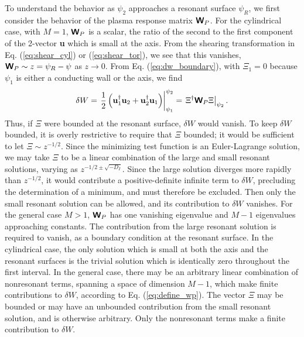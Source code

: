 \documentclass[prb,twocolumn,showpacs,preprintnumbers,amsmath,amssymb]{revtex4}
\renewcommand*{\v}[1]{\hbox{\bfseries #1}}
\renewcommand*{\t}[1]{\hbox{\sffamily\bfseries #1}}
\begin{document}
To understand the behavior as $\psi_2$ approaches a resonant surface
$\psi_R$, we first consider the behavior of the plasma response matrix
$\t{W}_P$.  For the cylindrical case, with $M=1$, $\t{W}_P$ is a scalar,
the ratio of the second to the first component of the 2-vector \v{u}
which is small at the axis.  From the shearing transformation in
Eq. (\ref{eq:shear_cyl}) or (\ref{eq:shear_tor}), we see that this
vanishes, $\t{W}_P \sim z=\psi_R-\psi$ as $z \to 0$.  From
Eq. (\ref{eq:dw_boundary}), with $\Xi_1=0$ because $\psi_1$ is either a
conducting wall or the axis, we find
\begin{equation}
\delta W 
= \left. \frac{1}{2} \left( 
	\v{u}_1^\dagger \v{u}_2 + \v{u}_2^\dagger \v{u}_1
	 \right) \right|_{\psi_1}^{\psi_2}
= \left. \Xi^\dagger \t{W}_P \Xi \right|_{\psi_2}.
\label{eq:define_wp}
\end{equation}
Thus, if $\Xi$ were bounded at the resonant surface, $\delta W$ would
vanish.  To keep $\delta W$ bounded, it is overly restrictive to require
that $\Xi$ bounded; it would be sufficient to let $\Xi \sim z^{-1/2}$.
Since the minimizing test function is an Euler-Lagrange solution, we may
take $\Xi$ to be a linear combination of the large and small resonant
solutions, varying as $z^{-1/2 \pm \sqrt{-D_I}}$.  Since the large
solution diverges more rapidly than $z^{-1/2}$, it would contribute a
positive-definite infinite term to $\delta W$, precluding the
determination of a minimum, and must therefore be excluded.  Then only
the small resonant solution can be allowed, and its contribution to
$\delta W$ vanishes.  For the general case $M > 1$, $\t{W}_P$ has one
vanishing eigenvalue and $M-1$ eigenvalues approaching constants.  The
contribution from the large resonant solution is required to vanish, as
a boundary condition at the resonant surface.  In the cylindrical case,
the only solution which is small at both the axis and the resonant
surfaces is the trivial solution which is identically zero throughout
the first interval.  In the general case, there may be an arbitrary
linear combination of nonresonant terms, spanning a space of dimension
$M-1$, which make finite contributions to $\delta W$, according to Eq.
(\ref{eq:define_wp}).  The vector $\Xi$ may be bounded or may have an
unbounded contribution from the small resonant solution, and is
otherwise arbitrary.  Only the nonresonant terms make a finite
contribution to $\delta W$.
\end{document}
